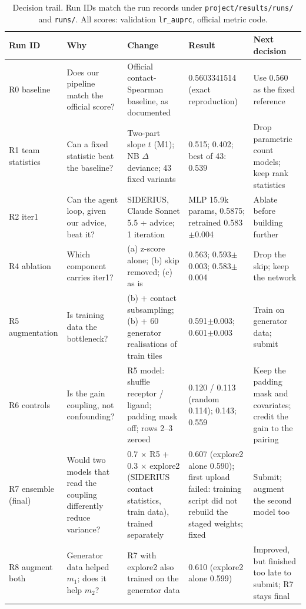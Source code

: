 \documentclass{article}
\begin{document}
\begin{table}[ht]
\caption{Decision trail. Run IDs match the run records under \texttt{project/results/runs/} and
\texttt{runs/}. All scores: validation \texttt{lr\_auprc}, official metric code.}
\label{tab:trajectory}
\centering\scriptsize
\begin{tabularx}{\textwidth}{@{}lXXXX@{}}
\toprule
Run ID & Why & Change & Result & Next decision \\
\midrule
R0 baseline & Does our pipeline match the official score? & Official contact-Spearman baseline, as documented & 0.5603341514 (exact reproduction) & Use 0.560 as the fixed reference \\
R1 team statistics & Can a fixed statistic beat the baseline? & Two-part slope $t$ (M1); NB $\Delta$deviance; 43 fixed variants & 0.515; 0.402; best of 43: 0.539 & Drop parametric count models; keep rank statistics \\
R2 iter1 & Can the agent loop, given our advice, beat it? & SIDERIUS, Claude Sonnet 5.5 + advice; 1 iteration & MLP 15.9k params, 0.5875; retrained 0.583$\pm$0.004 & Ablate before building further \\
R4 ablation & Which component carries iter1? & (a) z-score alone; (b) skip removed; (c) as is & 0.563; 0.593$\pm$0.003; 0.583$\pm$0.004 & Drop the skip; keep the network \\
R5 augmentation & Is training data the bottleneck? & (b) + contact subsampling; (b) + 60 generator realisations of train tiles & 0.591$\pm$0.003; 0.601$\pm$0.003 & Train on generator data; submit \\
R6 controls & Is the gain coupling, not confounding? & R5 model: shuffle receptor / ligand; padding mask off; rows 2--3 zeroed & 0.120 / 0.113 (random 0.114); 0.143; 0.559 & Keep the padding mask and covariates; credit the gain to the pairing \\
R7 ensemble (final) & Would two models that read the coupling differently reduce variance? & 0.7 $\times$ R5 + 0.3 $\times$ explore2 (SIDERIUS contact statistics, train data), trained separately & 0.607 (explore2 alone 0.590); first upload failed: training script did not rebuild the staged weights; fixed & Submit; augment the second model too \\
R8 augment both & Generator data helped $m_1$; does it help $m_2$? & R7 with explore2 also trained on the generator data & 0.610 (explore2 alone 0.599) & Improved, but finished too late to submit; R7 stays final \\
\bottomrule
\end{tabularx}
\end{table}
\end{document}
